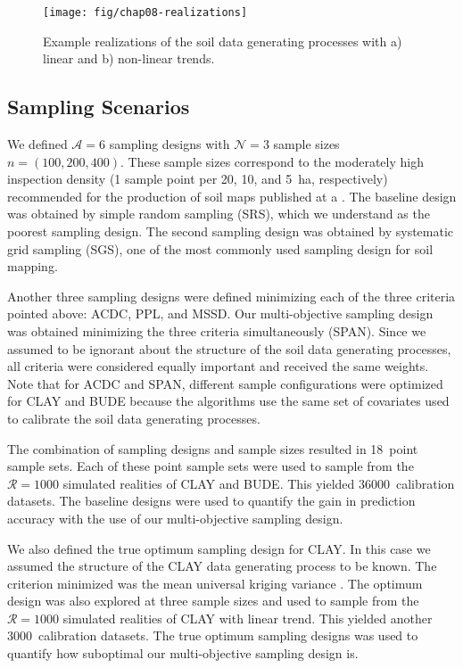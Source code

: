 \begin{figure}[!ht]
 \centering
 \texttt{[image: fig/chap08-realizations]}
 \caption{Example realizations of the soil data generating processes with a) linear and b) non-linear trends.}
 \label{fig:chap08-realizations}
\end{figure}

\subsection{Sampling Scenarios}

We defined $\mathcal{A} = 6$ sampling designs with $\mathcal{N} = 3$ sample sizes $n = (100, 200, 400)$. These 
sample sizes correspond to the moderately high inspection density (1 sample point per 20, 10, and 
\SI{5}{\hectare}, respectively) recommended for the production of soil maps published at a  
\cite{Rossiter, 2000}. The baseline design was obtained by simple random sampling (SRS), which we understand as 
the poorest sampling design. The second sampling design was obtained by systematic grid sampling (SGS), one of 
the most commonly used sampling design for soil mapping.

Another three sampling designs were defined minimizing each of the three criteria pointed above: ACDC, PPL, and 
MSSD. Our multi-objective sampling design was obtained minimizing the three criteria simultaneously (SPAN). 
Since we assumed to be ignorant about the structure of the soil data generating processes, all criteria were 
considered equally important and received the same weights. Note that for ACDC and SPAN, different sample 
configurations were optimized for CLAY and BUDE because the algorithms use the same set of covariates used to 
calibrate the soil data generating processes.

The combination of sampling designs and sample sizes resulted in 18~point sample sets. Each of these point 
sample sets were used to sample from the $\mathcal{R} = 1000$ simulated realities of CLAY and BUDE. This 
yielded \num{36000}~calibration datasets. The baseline designs were used to quantify the gain in prediction 
accuracy with the use of our multi-objective sampling design.

We also defined the true optimum sampling design for CLAY. In this case we assumed the structure of the CLAY 
data generating process to be known. The criterion minimized was the mean universal kriging variance 
\cite{BrusEtAl2007a}. The optimum design was also explored at three sample sizes and used to sample from the 
$\mathcal{R} = 1000$ simulated realities of CLAY with linear trend. This yielded another 3000~calibration 
datasets. The true optimum sampling designs was used to quantify how suboptimal our multi-objective sampling 
design is.

